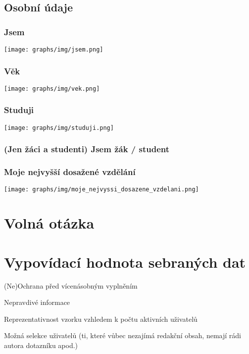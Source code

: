 \documentclass[12pt, a4paper, twoside]{article}
\begin{document}
\subsection{Osobní údaje}\label{sec:osobni}

\subsubsection{Jsem}

\texttt{[image: graphs/img/jsem.png]}

\subsubsection{Věk}

\texttt{[image: graphs/img/vek.png]}

\subsubsection{Studuji}

\texttt{[image: graphs/img/studuji.png]}

\subsubsection{(Jen žáci a studenti) Jsem žák / student}

\subsubsection{Moje nejvyšší dosažené vzdělání}

\texttt{[image: graphs/img/moje\_nejvyssi\_dosazene\_vzdelani.png]}

\section{Volná otázka }

\section{Vypovídací hodnota sebraných dat}

(Ne)Ochrana před vícenásobným vyplněním

Nepravdivé informace

Reprezentativnost vzorku vzhledem k počtu aktivních uživatelů

Možná selekce uživatelů (ti, které vůbec nezajímá redakční obsah,
nemají rádi autora dotazníku apod.)
\end{document}
